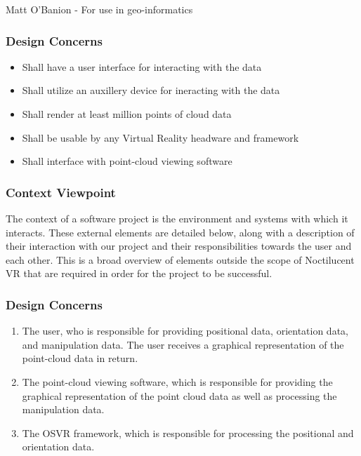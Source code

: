 Matt O'Banion - For use in geo-informatics

\subsubsection{Design Concerns}

\begin{itemize}
 \item Shall have a user interface for interacting with the data
 \item Shall utilize an auxillery device for ineracting with the data
 \item Shall render at least million points of cloud data
 \item Shall be usable by any Virtual Reality headware and framework
 \item Shall interface with point-cloud viewing software
\end{itemize}

\subsubsection{Context Viewpoint}

The context of a software project is the environment and systems with which it interacts. 
These external elements are detailed below, along with a description of their interaction with our project and their responsibilities towards the user and each other. 
This is a broad overview of elements outside the scope of Noctilucent VR that are required in order for the project to be successful. 

\subsubsection{Design Concerns}

\begin{enumerate}
\item The user, who is responsible for providing positional data, orientation data, and manipulation data. 
The user receives a graphical representation of the point-cloud data in return.
\item The point-cloud viewing software, which is responsible for providing the graphical representation of the point cloud data as well as processing the manipulation data.
\item The OSVR framework, which is responsible for processing the positional and orientation data.  
\end{enumerate}

